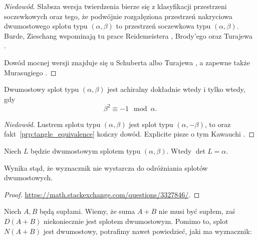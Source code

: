 \begin{proof}[Niedowód]
    Słabsza wersja twierdzenia bierze się z klasyfikacji przestrzeni soczewkowych oraz tego, że podwójnie rozgałęziona przestrzeń nakryciowa dwumostowego splotu typu $(\alpha, \beta)$ to przestrzeń soczewkowa typu $(\alpha, \beta)$.
%
%
    Burde, Zieschang \cite[s. 212]{burde2014} wspominają tu prace Reidemeistera \cite{reidemeister1935}, Brody'ego \cite{brody1960} oraz Turajewa \cite{turaevXX}.

    Dowód mocnej wersji znajduje się u Schuberta \cite{schubert1956} albo Turajewa \cite{turaevXX}, a zapewne także Murasugiego \cite[s. 158]{murasugi1996}.
\end{proof}

\begin{proposition}
    Dwumostowy splot typu $(\alpha, \beta)$ jest achiralny dokładnie wtedy i tylko wtedy, gdy
    \begin{equation}
        \beta^2 \equiv -1 \mod \alpha.
    \end{equation}
\end{proposition}

\begin{proof}[Niedowód]
    Lustrem splotu typu $(\alpha, \beta)$ jest splot typu $(\alpha, -\beta)$, to oraz fakt~\ref{prp:tangle_equivalence} kończy dowód.
    Explicite pisze o tym Kawauchi \cite[s. 24]{kawauchi1996}.
\end{proof}

\begin{proposition}
    Niech $L$ będzie dwumostowym splotem typu $(\alpha, \beta)$.
    Wtedy $\det L = \alpha$.
\end{proposition}

Wynika stąd, że wyznacznik nie wystarcza do odróżniania splotów dwumostowych.

\begin{proof}
    \url{https://math.stackexchange.com/questions/3327846/}.
\end{proof}

Niech $A, B$ będą supłami.
Wiemy, że suma $A+B$ nie musi być supłem, zaś $D(A+B)$ niekoniecznie jest splotem dwumostowym.
Pomimo to, splot $N(A+B)$ jest dwumostowy, potrafimy nawet powiedzieć, jaki ma wyznacznik:

